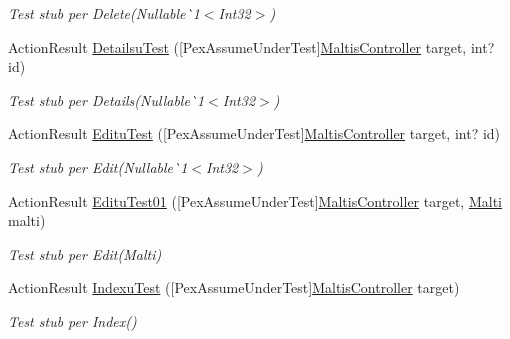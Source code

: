 \begin{DoxyCompactItemize}
\begin{DoxyCompactList}\small\item\em Test stub per Delete(Nullable\`{}1$<$Int32$>$)\end{DoxyCompactList}\item 
Action\+Result \mbox{\hyperlink{class_brew_day2_1_1_controllers_1_1_unit_test_1_1_maltis_controlleru_test_af12668bc8cbf6d58351357719ee000e4}{Detailsu\+Test}} (\mbox{[}Pex\+Assume\+Under\+Test\mbox{]}\mbox{\hyperlink{class_brew_day2_1_1_controllers_1_1_maltis_controller}{Maltis\+Controller}} target, int? id)
\begin{DoxyCompactList}\small\item\em Test stub per Details(Nullable\`{}1$<$Int32$>$)\end{DoxyCompactList}\item 
Action\+Result \mbox{\hyperlink{class_brew_day2_1_1_controllers_1_1_unit_test_1_1_maltis_controlleru_test_a70caf67f97ac2742ccc1db8e748c20c4}{Editu\+Test}} (\mbox{[}Pex\+Assume\+Under\+Test\mbox{]}\mbox{\hyperlink{class_brew_day2_1_1_controllers_1_1_maltis_controller}{Maltis\+Controller}} target, int? id)
\begin{DoxyCompactList}\small\item\em Test stub per Edit(Nullable\`{}1$<$Int32$>$)\end{DoxyCompactList}\item 
Action\+Result \mbox{\hyperlink{class_brew_day2_1_1_controllers_1_1_unit_test_1_1_maltis_controlleru_test_a44d1a614c361f6aa994de4b03206293f}{Editu\+Test01}} (\mbox{[}Pex\+Assume\+Under\+Test\mbox{]}\mbox{\hyperlink{class_brew_day2_1_1_controllers_1_1_maltis_controller}{Maltis\+Controller}} target, \mbox{\hyperlink{class_brew_day2_1_1_models_1_1_malti}{Malti}} malti)
\begin{DoxyCompactList}\small\item\em Test stub per Edit(\+Malti)\end{DoxyCompactList}\item 
Action\+Result \mbox{\hyperlink{class_brew_day2_1_1_controllers_1_1_unit_test_1_1_maltis_controlleru_test_a85b0bf25ad9e49d0d28defa68cbd564a}{Indexu\+Test}} (\mbox{[}Pex\+Assume\+Under\+Test\mbox{]}\mbox{\hyperlink{class_brew_day2_1_1_controllers_1_1_maltis_controller}{Maltis\+Controller}} target)
\begin{DoxyCompactList}\small\item\em Test stub per Index()\end{DoxyCompactList}\end{DoxyCompactItemize}


